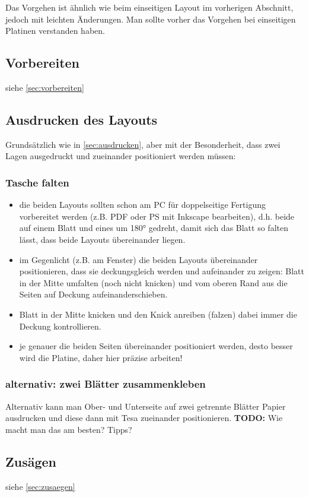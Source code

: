 \documentclass{\basedir/fablab-document}
\begin{document}
Das Vorgehen ist ähnlich wie beim einseitigen Layout im vorherigen Abschnitt, jedoch mit leichten Änderungen. Man sollte vorher das Vorgehen bei einseitigen Platinen verstanden haben.
\secttoc

\subsection{Vorbereiten}
siehe \ref{sec:vorbereiten}

\subsection{Ausdrucken des Layouts}
Grundsätzlich wie in \ref{sec:ausdrucken}, aber mit der Besonderheit, dass zwei Lagen ausgedruckt und zueinander positioniert werden müssen:

\subsubsection{Tasche falten}
\begin{itemize}
\item die beiden Layouts sollten schon am PC für doppelseitige Fertigung vorbereitet werden (z.B. PDF oder PS mit Inkscape bearbeiten), d.h. beide auf einem Blatt und eines um 180° gedreht, damit sich das Blatt so falten lässt, dass beide Layouts übereinander liegen.
\item im Gegenlicht (z.B. am Fenster) die beiden Layouts übereinander positionieren, dass sie deckungsgleich werden und aufeinander zu zeigen: Blatt in der Mitte umfalten (noch nicht knicken) und vom oberen Rand aus die Seiten auf Deckung aufeinanderschieben.
\item Blatt in der Mitte knicken und den Knick anreiben (falzen) dabei immer die Deckung kontrollieren.
\item je genauer die beiden Seiten übereinander positioniert werden, desto besser wird die Platine, daher hier präzise arbeiten!
\end{itemize}
\subsubsection{alternativ: zwei Blätter zusammenkleben}
Alternativ kann man Ober- und Unterseite auf zwei getrennte Blätter Papier ausdrucken und diese dann mit Tesa zueinander positionieren. \textbf{TODO:} Wie macht man das am besten? Tipps?

\subsection{Zusägen}
siehe \ref{sec:zusaegen}
\end{document}
